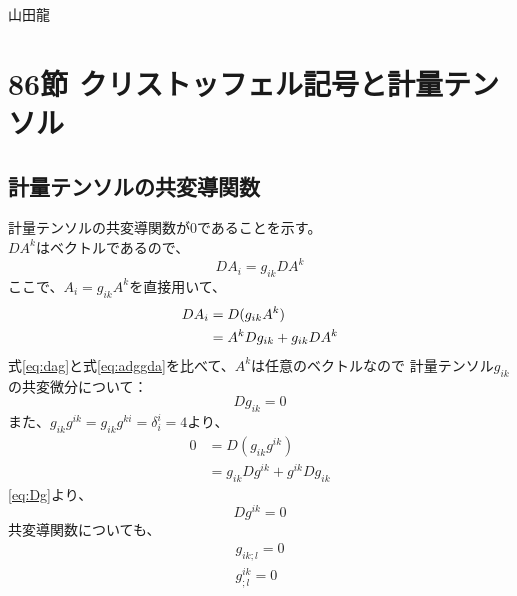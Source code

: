 \documentclass{jsarticle}
\begin{document}
山田龍
\section{86節 クリストッフェル記号と計量テンソル}
\subsection{計量テンソルの共変導関数}
計量テンソルの共変導関数が0であることを示す。\\
$DA^{k}$はベクトルであるので、%
\begin{equation}
    DA_{i} = g_{ik} DA^{k}\label{eq:dag}
\end{equation}
ここで、$A_{i} = g_{ik} A^{k}$を直接用いて、
\begin{align}
    DA_{i} &= D(g_{ik}A^{k}) \notag\\
           &= A^{k}Dg_{ik} + g_{ik} DA^{k}\label{eq:adggda}
\end{align}
式\eqref{eq:dag}と式\eqref{eq:adggda}を比べて、$A^{k}$は任意のベクトルなので
計量テンソル$g_{ik}$の共変微分について：
\begin{equation}
    Dg_{ik} = 0 \label{eq:Dg}
\end{equation}
また、$g_{ik}g^{ik}=g_{ik}g^{ki}=\delta^{i}_{i}=4$より、
\begin{align}
    0 &= D(g_{ik}g^{ik}) \\
      &= g_{ik}Dg^{ik} + g^{ik}Dg_{ik}
\end{align}
\eqref{eq:Dg}より、
\begin{equation}
    Dg^{ik} = 0
\end{equation}
共変導関数についても、
\begin{align}
    g_{ik;l} = 0 \label{eq:gikl}\\
    g^{ik}_{;l} = 0
\end{align}
\end{document}
